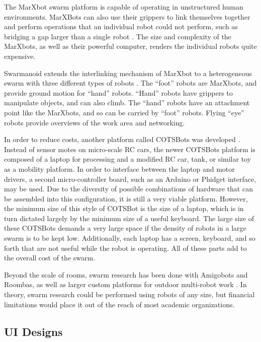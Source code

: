 \documentclass[]{article}
\begin{document}
The MarXbot swarm platform is capable of operating in unstructured human environments. 
MarXBots can also use their grippers to link themselves together and perform operations that an individual robot could not perform, such as bridging a gap larger than a single robot \cite{bonani2010marxbot}. 
The size and complexity of the MarXbots, as well as their powerful computer, renders the individual robots quite expensive. 

Swarmanoid extends the interlinking mechanism of MarXbot to a heterogeneous swarm with three different types of robots \cite{dorigo2013swarmanoid}.
The ``foot'' robots are MarXbots, and provide ground motion for ``hand'' robots. 
``Hand'' robots have grippers to manipulate objects, and can also climb.
The ``hand'' robots have an attachment point like the MarXbots, and so can be carried by ``foot'' robots. 
Flying ``eye'' robots provide overviews of the work area and networking.  

In order to reduce costs, another platform called COTSBots was developed \cite{soule2011cotsbots}.  
Instead of sensor motes on micro-scale RC cars, the newer COTSBots platform is composed of a laptop for processing and a modified RC car, tank, or similar toy as a mobility platform.
In order to interface between the laptop and motor drivers, a second micro-controller board, such as an Arduino or Phidget interface, may be used. 
Due to the diversity of possible combinations of hardware that can be assembled into this configuration, it is still a very viable platform. 
However, the minimum size of this style of COTSBot is the size of a laptop, which is in turn dictated largely by the minimum size of a useful keyboard. 
The large size of these COTSBots demands a very large space if the density of robots in a large swarm is to be kept low. 
Additionally, each laptop has a screen, keyboard, and so forth that are not useful while the robot is operating. 
All of these parts add to the overall cost of the swarm. 

Beyond the scale of rooms, swarm research has been done with Amigobots and Roombas, as well as larger custom platforms for outdoor multi-robot work \cite{guo2007bio, tammet2008rfid, olson2013cacm}.
In theory, swarm research could be performed using robots of any size, but financial limitations would place it out of the reach of most academic organizations. 

\subsection{UI Designs}
\end{document}
